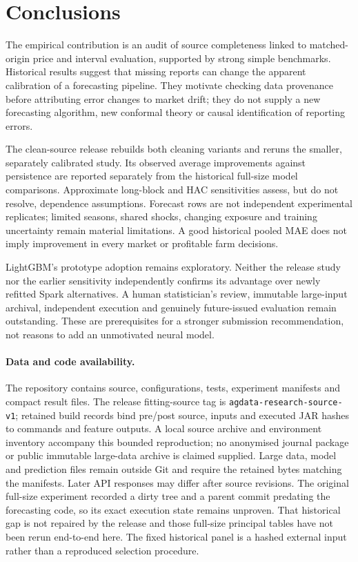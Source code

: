 \section{Conclusions}\label{sec:conclusion}
The empirical contribution is an audit of source completeness linked to matched-origin price and interval evaluation, supported by strong simple benchmarks. Historical results suggest that missing reports can change the apparent calibration of a forecasting pipeline. They motivate checking data provenance before attributing error changes to market drift; they do not supply a new forecasting algorithm, new conformal theory or causal identification of reporting errors.

The clean-source release rebuilds both cleaning variants and reruns the smaller, separately calibrated study. Its observed average improvements against persistence are reported separately from the historical full-size model comparisons. Approximate long-block and HAC sensitivities assess, but do not resolve, dependence assumptions. Forecast rows are not independent experimental replicates; limited seasons, shared shocks, changing exposure and training uncertainty remain material limitations. A good historical pooled MAE does not imply improvement in every market or profitable farm decisions.

LightGBM's prototype adoption remains exploratory. Neither the release study nor the earlier sensitivity independently confirms its advantage over newly refitted Spark alternatives. A human statistician's review, immutable large-input archival, independent execution and genuinely future-issued evaluation remain outstanding. These are prerequisites for a stronger submission recommendation, not reasons to add an unmotivated neural model.

\paragraph{Data and code availability.}
The repository contains source, configurations, tests, experiment manifests and compact result files. The release fitting-source tag is \texttt{agdata-}\allowbreak\texttt{research-}\allowbreak\texttt{source-v1}; retained build records bind pre/post source, inputs and executed JAR hashes to commands and feature outputs. A local source archive and environment inventory accompany this bounded reproduction; no anonymised journal package or public immutable large-data archive is claimed supplied. Large data, model and prediction files remain outside Git and require the retained bytes matching the manifests. Later API responses may differ after source revisions.
The original full-size experiment recorded a dirty tree and a parent commit predating the forecasting code, so its exact execution state remains unproven. That historical gap is not repaired by the release and those full-size principal tables have not been rerun end-to-end here. The fixed historical panel is a hashed external input rather than a reproduced selection procedure.

